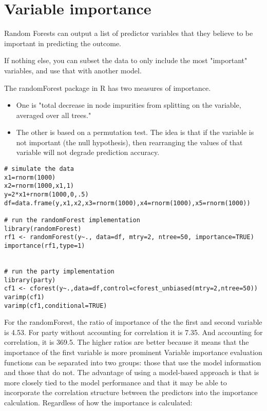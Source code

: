 \documentclass[caret-main.tex]{subfiles}
\begin{document}
\section{Variable importance}
Random Forests can output a list of predictor variables that they believe to be important in predicting the outcome. 

If nothing else, you can subset the data to only include the most "important" variables, and use that with another model. 

The randomForest package in R has two measures of importance. 

\begin{itemize}
\item One is "total decrease in node impurities from splitting on the variable, averaged over all trees."
\item The other is based on a permutation test. 
The idea is that if the variable is not important (the null hypothesis), then rearranging the values of that variable 
will not degrade prediction accuracy. 
\end{itemize}
 

\begin{framed}
\begin{verbatim}
# simulate the data
x1=rnorm(1000)
x2=rnorm(1000,x1,1)
y=2*x1+rnorm(1000,0,.5)
df=data.frame(y,x1,x2,x3=rnorm(1000),x4=rnorm(1000),x5=rnorm(1000))

# run the randomForest implementation
library(randomForest)
rf1 <- randomForest(y~., data=df, mtry=2, ntree=50, importance=TRUE)
importance(rf1,type=1)


# run the party implementation
library(party)
cf1 <- cforest(y~.,data=df,control=cforest_unbiased(mtry=2,ntree=50))
varimp(cf1)
varimp(cf1,conditional=TRUE)

\end{verbatim}
\end{framed}

For the randomForest, the ratio of importance of the the first and second variable is 4.53. 
For party without accounting for correlation it is 7.35. And accounting for correlation, it is 369.5. The higher ratios are better because it means that the importance of the first variable is more prominent
\newpage
Variable importance evaluation functions can be separated into two groups: those that use the model information and those that do not. The advantage of using a model-based approach is that is more closely tied to the model performance and that it may be able to incorporate the correlation structure between the predictors into the importance calculation. Regardless of how the importance is calculated:
\end{document}
